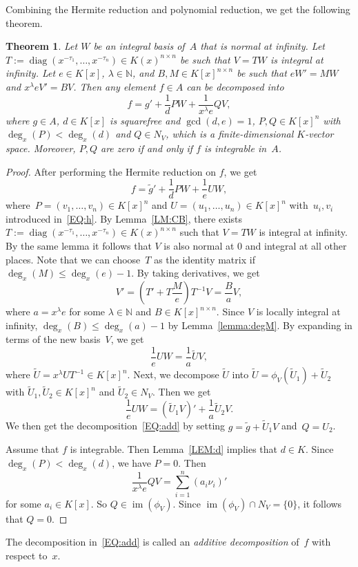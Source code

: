 \documentclass{sig-alternate-05-2015}
\newtheorem{theorem}{Theorem}
\newcommand{\bN}{ {\mathbb N}}
\def\im{\operatorname{im}}
\def\diag{\operatorname{diag}}
\begin{document}
Combining the Hermite reduction and polynomial reduction, we get the following theorem.
\begin{theorem}\label{THM:polyred}
Let $W$ be an integral basis of~$A$ that is normal at infinity.
Let $T := \diag(x^{-\tau_1}, \ldots, x^{-\tau_n}) \in K(x)^{n\times n}$
be such that $V = TW$ is integral at infinity.
Let $e\in K[x]$, $\lambda \in \bN$, and $B, M \in K[x]^{n \times n} $ be such that
$eW' = MW$ and $x^\lambda eV' = BV$.
Then any element $f\in A$ can be decomposed into
\begin{equation}\label{EQ:add}
f = g' + \frac{1}{d} PW + \frac{1}{x^\lambda e} QV,
\end{equation}
where $g\in A$, $d\in K[x]$ is squarefree and $\gcd(d, e)=1$, $P, Q\in K[x]^n$ with $\deg_x(P) < \deg_x(d)$ and $Q\in N_V$, which is
a finite-dimensional $K$-vector space. Moreover, $P, Q$ are zero if and only if $f$ is integrable in~$A$.
\end{theorem}
\begin{proof}
After performing the Hermite reduction on $f$, we get
\[f = \tilde{g}' + \frac{1}{d} PW + \frac{1}{e} UW,\]
where~$P = (v_1, \ldots, v_n)\in K[x]^n$ and $U = (u_1, \ldots, u_n)\in K[x]^n$
with~$u_i, v_i$ introduced in~\eqref{EQ:h}. By Lemma~\ref{LM:CB}, there exists
$T := \diag(x^{-\tau_1}, \ldots, x^{-\tau_n}) \in K(x)^{n\times n}$
such that $V = TW$ is integral at infinity. By the same lemma it follows
that $V$ is also normal at $0$ and integral at all other places. Note that we can
choose~$T$ as the identity matrix if~$\deg_x(M)\leq \deg_x(e)-1$.
By taking derivatives, we get
\[V' = \left(T' + T\frac{M}{e}\right)T^{-1}V = \frac{B}{a}V, \]
where $a=x^\lambda e$ for some $\lambda\in \bN$ and $B\in K[x]^{n\times n}$. Since $V$ is locally integral
at infinity, $\deg_x(B) \leq \deg_x(a)-1$ by Lemma~\ref{lemma:degM}.
By expanding in terms of the new basis~$V$, we get
\[\frac{1}{e} UW = \frac{1}{a} \tilde{U}V, \]
where $\tilde{U} = x^\lambda U T^{-1} \in K[x]^n$. Next, we decompose $\tilde{U}$ into
$\tilde{U} = \phi_{V}(\tilde{U}_1) + \tilde{U}_2$ with $\tilde{U}_1, \tilde{U}_2\in K[x]^n$ and
$\tilde{U}_2\in N_V$. Then we get
\[\frac{1}{e} UW = (\tilde U_1 V)' + \frac{1}{a} \tilde U_2 V. \]
We then get the decomposition~\eqref{EQ:add} by setting
$g = \tilde g + \tilde U_1 V$ and~$Q = U_2$.

Assume that $f$ is integrable. Then Lemma~\ref{LEM:d} implies that $d\in K$.
Since $\deg_x(P) < \deg_x(d)$, we have $P=0$. Then
\[\frac{1}{x^\lambda e} QV = \sum_{i=1}^n (a_i \nu_i)'\]
for some $a_i\in K[x]$. So $Q \in \im(\phi_V)$.
Since $\im(\phi_V) \cap N_V = \{0\}$, it follows that $Q=0$.
\end{proof}
The decomposition in~\eqref{EQ:add} is called an \emph{additive decomposition} of~$f$ with respect to~$x$.
\end{document}
